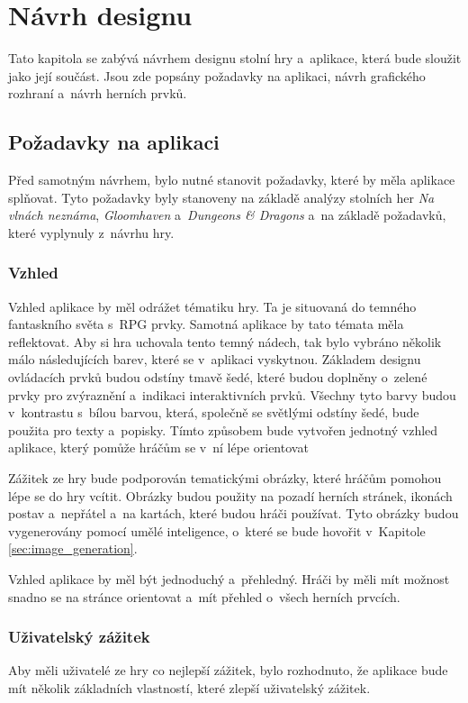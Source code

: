 \chapter{Návrh designu}
Tato kapitola se zabývá návrhem designu stolní hry a~aplikace, která bude sloužit jako její součást. Jsou zde popsány požadavky na aplikaci, návrh grafického rozhraní a~návrh herních prvků.

\section{Požadavky na aplikaci}
Před samotným návrhem, bylo nutné stanovit požadavky, které by měla aplikace splňovat. Tyto požadavky byly stanoveny na základě analýzy stolních her \textit{Na vlnách neznáma}, \textit{Gloomhaven} a~\textit{Dungeons \& Dragons} a~na základě požadavků, které vyplynuly z~návrhu hry.

\subsection{Vzhled}
Vzhled aplikace by měl odrážet tématiku hry. Ta je situovaná do temného fantaskního světa s~RPG prvky. Samotná aplikace by tato témata měla reflektovat. Aby si hra uchovala tento temný nádech, tak bylo vybráno několik málo následujících barev, které se v~aplikaci vyskytnou. Základem designu ovládacích prvků budou odstíny tmavě šedé, které budou doplněny o~zelené prvky pro zvýraznění a~indikaci interaktivních prvků. Všechny tyto barvy budou v~kontrastu s~bílou barvou, která, společně se světlými odstíny šedé, bude použita pro texty a~popisky. Tímto způsobem bude vytvořen jednotný vzhled aplikace, který pomůže hráčům se v~ní lépe orientovat

Zážitek ze hry bude podporován tematickými obrázky, které hráčům pomohou lépe se do hry vcítit. Obrázky budou použity na pozadí herních stránek, ikonách postav a~nepřátel a~na kartách, které budou hráči používat. Tyto obrázky budou vygenerovány pomocí umělé inteligence, o~které se bude hovořit v~Kapitole \ref{sec:image_generation}.

Vzhled aplikace by měl být jednoduchý a~přehledný. Hráči by měli mít možnost snadno se na stránce orientovat a~mít přehled o~všech herních prvcích.

\subsection{Uživatelský zážitek}
Aby měli uživatelé ze hry co nejlepší zážitek, bylo rozhodnuto, že aplikace bude mít několik základních vlastností, které zlepší uživatelský zážitek.

